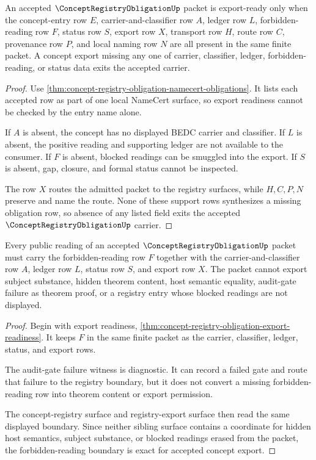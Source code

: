 \begin{theorem}
\label{thm:concept-registry-obligation-export-readiness}
An accepted $\ConceptRegistryObligationUp$ packet is export-ready only when the concept-entry row $E$, carrier-and-classifier row $A$, ledger row $L$, forbidden-reading row $F$, status row $S$, export row $X$, transport row $H$, route row $C$, provenance row $P$, and local naming row $N$ are all present in the same finite packet. A concept export missing any one of carrier, classifier, ledger, forbidden-reading, or status data exits the accepted carrier.
\end{theorem}
\begin{proof}
Use \autoref{thm:concept-registry-obligation-namecert-obligations}. It lists each accepted row as part of one local NameCert surface, so export readiness cannot be checked by the entry name alone.

If $A$ is absent, the concept has no displayed BEDC carrier and classifier. If $L$ is absent, the positive reading and supporting ledger are not available to the consumer. If $F$ is absent, blocked readings can be smuggled into the export. If $S$ is absent, gap, closure, and formal status cannot be inspected.

The row $X$ routes the admitted packet to the registry surfaces, while $H,C,P,N$ preserve and name the route. None of these support rows synthesizes a missing obligation row, so absence of any listed field exits the accepted $\ConceptRegistryObligationUp$ carrier.
\end{proof}

\begin{theorem}
\label{thm:concept-registry-obligation-forbidden-reading-boundary}
Every public reading of an accepted $\ConceptRegistryObligationUp$ packet must carry the forbidden-reading row $F$ together with the carrier-and-classifier row $A$, ledger row $L$, status row $S$, and export row $X$. The packet cannot export subject substance, hidden theorem content, host semantic equality, audit-gate failure as theorem proof, or a registry entry whose blocked readings are not displayed.
\end{theorem}
\begin{proof}
Begin with export readiness, \autoref{thm:concept-registry-obligation-export-readiness}. It keeps $F$ in the same finite packet as the carrier, classifier, ledger, status, and export rows.

The audit-gate failure witness is diagnostic. It can record a failed gate and route that failure to the registry boundary, but it does not convert a missing forbidden-reading row into theorem content or export permission.

The concept-registry surface and registry-export surface then read the same displayed boundary. Since neither sibling surface contains a coordinate for hidden host semantics, subject substance, or blocked readings erased from the packet, the forbidden-reading boundary is exact for accepted concept export.
\end{proof}

